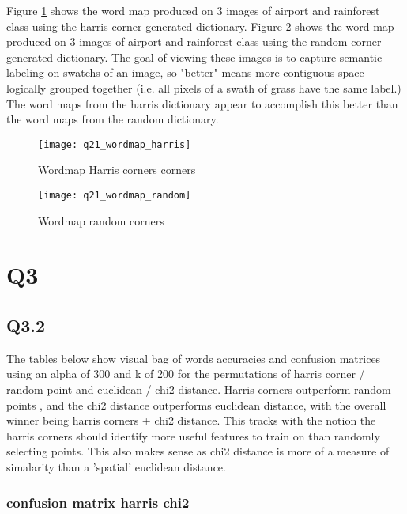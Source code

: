 \documentclass[12pt]{article}
\begin{document}
Figure \ref{fig:wordmapharris} shows the word map produced on 3 images of airport and rainforest class using the harris corner generated dictionary.
Figure \ref{fig:wordmaprandom} shows the word map produced on 3 images of airport and rainforest class using the random corner generated dictionary.
The goal of viewing these images is to capture semantic labeling on swatchs of an image, so "better" means more contiguous space logically grouped together (i.e. all pixels of a swath of grass have the same label.) The word maps from the harris dictionary appear to accomplish this better than the word maps from the random dictionary.

\begin{figure}[H]
\centering
\texttt{[image: q21\_wordmap\_harris]}
\caption{Wordmap Harris corners corners}    
\label{fig:wordmapharris}
\end{figure}   


\begin{figure}[H]
\centering
\texttt{[image: q21\_wordmap\_random]}
\caption{Wordmap random corners}    
\label{fig:wordmaprandom}
\end{figure}   

\newpage
\section{Q3}
\subsection{Q3.2}

The tables below show visual bag of words accuracies and confusion matrices using an alpha of 300 and k of 200 for the permutations of harris corner / random point and euclidean / chi2 distance.  Harris corners outperform random points , and the chi2 distance outperforms euclidean distance, with the overall winner being harris corners + chi2 distance. This tracks with the notion the harris corners should identify more useful features to train on than randomly selecting points. This also makes sense as chi2 distance is more of a measure of simalarity than a 'spatial' euclidean distance.


\subsubsection{confusion matrix harris chi2}
\end{document}
